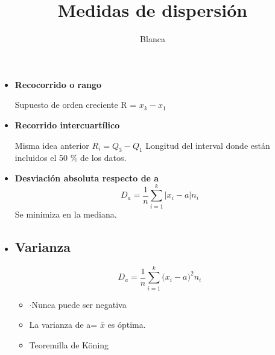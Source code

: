 
\ifdefined\COMPLETE

\begin{itemize}
	\item \textbf{Recocorrido o rango}
	\par Supuesto de orden creciente R = $ x_k - x_1$
	\item \textbf{Recorrido intercuartílico }
	\par Misma idea anterior $R_i = Q_3 - Q_1$ Longitud del interval donde están incluidos el 50 \% de los datos. 
	\item \textbf{Desviación absoluta respecto de a }
	$$ D_a = \frac{1}{n} \sum_{i=1}^{k} | x_i - a| n_i$$
	Se minimiza en la mediana.
	
	\item \subsection*{Varianza} 
	$$ D_a = \frac{1}{n} \sum_{i=1}^{k} \big( x_i - a \big)^2 n_i$$
	\begin{itemize}
		\item {$\cdot$}Nunca puede ser negativa
		\item La varianza de a= $\bar{x}$ es óptima. 
		\item Teoremilla de Köning 
	\end{itemize}
	
	
\end{itemize}


\else 
\def\COMPLETE{}

\documentclass[a4paper , 11pt, spanish ]{article}
\usepackage{paquetes}
\title {Medidas de dispersión}
\author{Blanca}



\maketitle 



\fi
